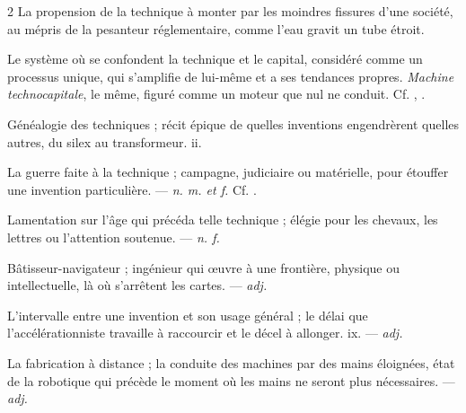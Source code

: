 \begin{multicols}{2}
 La propension de la technique à monter par les moindres fissures d'une société, au mépris de la pesanteur réglementaire, comme l'eau gravit un tube étroit.

 Le système où se confondent la technique et le capital, considéré comme un processus unique, qui s'amplifie de lui-même et a ses tendances propres. \textit{Machine technocapitale}, le même, figuré comme un moteur que nul ne conduit. Cf. , .

 Généalogie des techniques ; récit épique de quelles inventions engendrèrent quelles autres, du silex au transformeur.   ii.

 La guerre faite à la technique ; campagne, judiciaire ou matérielle, pour étouffer une invention particulière. —  \textit{n. m. et f.} Cf. .

 Lamentation sur l'âge qui précéda telle technique ; élégie pour les chevaux, les lettres ou l'attention soutenue. —  \textit{n. f.}

 Bâtisseur-navigateur ; ingénieur qui œuvre à une frontière, physique ou intellectuelle, là où s'arrêtent les cartes. —  \textit{adj.}

 L'intervalle entre une invention et son usage général ; le délai que l'accélérationniste travaille à raccourcir et le décel à allonger.   ix. —  \textit{adj.}

 La fabrication à distance ; la conduite des machines par des mains éloignées, état de la robotique qui précède le moment où les mains ne seront plus nécessaires. —  \textit{adj.}


\end{multicols}
